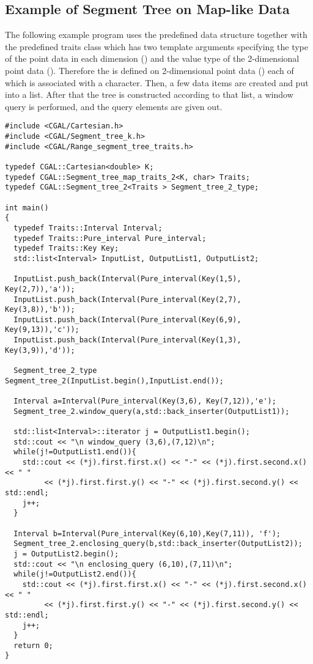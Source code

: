 
\subsection{Example of Segment Tree on Map-like Data\label{sec:segment_tree_ex}}

The following example program uses the predefined  data structure together with the predefined traits
  class  which has two template arguments
  specifying the
  type of the point data in each dimension
  () and the value type of the
  2-dimensional point data (). Therefore the  is defined on 2-dimensional point data
  () each of which is
  associated with a character.
Then, a few data items are created and put into a list. After
  that the tree is constructed according to that list, a window
  query is performed, and the query elements are given out.



\begin{verbatim}
#include <CGAL/Cartesian.h>
#include <CGAL/Segment_tree_k.h>
#include <CGAL/Range_segment_tree_traits.h>

typedef CGAL::Cartesian<double> K;
typedef CGAL::Segment_tree_map_traits_2<K, char> Traits;
typedef CGAL::Segment_tree_2<Traits > Segment_tree_2_type;

int main()
{
  typedef Traits::Interval Interval;
  typedef Traits::Pure_interval Pure_interval;
  typedef Traits::Key Key;
  std::list<Interval> InputList, OutputList1, OutputList2;

  InputList.push_back(Interval(Pure_interval(Key(1,5), Key(2,7)),'a'));
  InputList.push_back(Interval(Pure_interval(Key(2,7), Key(3,8)),'b'));
  InputList.push_back(Interval(Pure_interval(Key(6,9), Key(9,13)),'c'));
  InputList.push_back(Interval(Pure_interval(Key(1,3), Key(3,9)),'d'));
 
  Segment_tree_2_type Segment_tree_2(InputList.begin(),InputList.end());

  Interval a=Interval(Pure_interval(Key(3,6), Key(7,12)),'e');
  Segment_tree_2.window_query(a,std::back_inserter(OutputList1));

  std::list<Interval>::iterator j = OutputList1.begin();
  std::cout << "\n window_query (3,6),(7,12)\n";
  while(j!=OutputList1.end()){
    std::cout << (*j).first.first.x() << "-" << (*j).first.second.x() << " " 
         << (*j).first.first.y() << "-" << (*j).first.second.y() << std::endl; 
    j++;
  }
  
  Interval b=Interval(Pure_interval(Key(6,10),Key(7,11)), 'f');
  Segment_tree_2.enclosing_query(b,std::back_inserter(OutputList2));
  j = OutputList2.begin();
  std::cout << "\n enclosing_query (6,10),(7,11)\n";
  while(j!=OutputList2.end()){
    std::cout << (*j).first.first.x() << "-" << (*j).first.second.x() << " " 
         << (*j).first.first.y() << "-" << (*j).first.second.y() << std::endl; 
    j++;
  }
  return 0; 
}

\end{verbatim}

